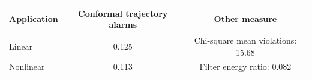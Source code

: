 \begin{tabular}{lcc}
\toprule
Application & Conformal trajectory alarms & Other measure \\
\midrule
Linear & 0.125 & Chi-square mean violations: 15.68 \\
Nonlinear & 0.113 & Filter energy ratio: 0.082 \\
\bottomrule
\end{tabular}
